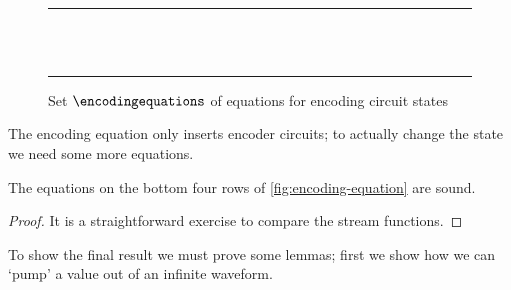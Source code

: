 \documentclass{lmcs}
\begin{document}
\begin{figure}
{        
        \)}
    \\[0.5em]
    \rule{\textwidth}{0.1mm}
    \\[0.75em]
    \quad
    \\[0.25em]
    \rule{\textwidth}{0.1mm}
    \caption{
        Set \(\encodingequations\) of equations for encoding circuit states
    }
    \label{fig:encoding-equation}
\end{figure}

The encoding equation only inserts encoder circuits; to actually change the
state we need some more equations.

\begin{lem}
    The equations on the bottom four rows of \autoref{fig:encoding-equation} are
    sound.
\end{lem}
\begin{proof}
    It is a straightforward exercise to compare the stream functions.
\end{proof}

To show the final result we must prove some lemmas; first we show how we can
`pump' a value out of an infinite waveform.
\end{document}
